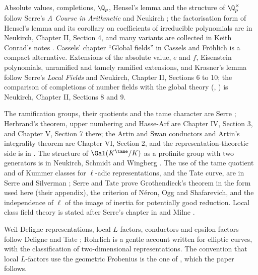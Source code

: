 Absolute values, completions, $\Q_p$, Hensel's lemma and the structure of $\Q_p^\times$ follow Serre's \emph{A Course in Arithmetic} \cite[Chapter II]{SerreCourse} and
Neukirch \cite[Chapter II, Sections 1 to 5]{Neukirch}; the factorisation form of Hensel's lemma and its corollary on coefficients of irreducible polynomials
are in Neukirch, Chapter II, Section 4, and many variants are collected in Keith Conrad's notes \cite{KConradHensel}. Cassels' chapter ``Global fields'' in
Cassels and Fr\"ohlich \cite{CasselsFrohlich} is a compact alternative. Extensions of the absolute value, $e$ and $f$, Eisenstein polynomials, unramified and
tamely ramified extensions, and Krasner's lemma follow Serre's \emph{Local Fields} \cite[Chapters I to IV]{SerreLocalFields} and Neukirch, Chapter II,
Sections 6 to 10; the comparison of completions of number fields with the global theory (,
) is Neukirch, Chapter II, Sections 8 and 9.

The ramification groups, their quotients and the tame character are Serre \cite[Chapter IV, Sections 1 and 2]{SerreLocalFields}; Herbrand's theorem, upper
numbering and Hasse-Arf are Chapter IV, Section 3, and Chapter V, Section 7 there; the Artin and Swan conductors and Artin's integrality theorem are Chapter VI,
Section 2, and the representation-theoretic side is in \cite[Chapter 19]{SerreLinearReps}. The structure of $\Gal(K^{\tame}/K)$ as a profinite group with two
generators is in Neukirch, Schmidt and Wingberg \cite[Chapter VII, Section 5]{NSW}. The use of the tame quotient and of Kummer classes for $\ell$-adic
representations, and the Tate curve, are in Serre \cite[Chapters I and IV]{SerreAbelian} and Silverman \cite[Chapter V]{SilvermanATAEC}; Serre and Tate
\cite[Sections 1 and 2]{SerreTate68} prove Grothendieck's theorem in the form used here (their appendix), the criterion of N\'eron, Ogg and Shafarevich, and the
independence of $\ell$ of the image of inertia for potentially good reduction. Local class field theory is stated after Serre's chapter in
\cite{CasselsFrohlich} and Milne \cite[Chapter I]{MilneCFT}.

Weil-Deligne representations, local $L$-factors, conductors and epsilon factors follow Deligne \cite[Section 8]{Deligne73} and Tate \cite[Section 4]{Tate79};
Rohrlich \cite{Rohrlich94} is a gentle account written for elliptic curves, with the classification of two-dimensional representations. The convention that local
$L$-factors use the geometric Frobenius is the one of \cite[Section 1.7.2]{DFG04}, which the paper follows.

